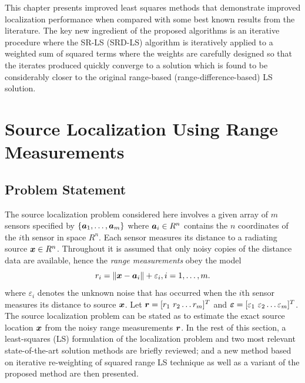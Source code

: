 This chapter presents improved least squares methods that demonstrate improved localization performance when compared with some best known results from the literature. The key new ingredient of the proposed algorithms is an iterative procedure where the SR-LS (SRD-LS) algorithm is iteratively applied to a weighted sum of squared terms where the weights are carefully designed so that the iterates produced quickly converge to a solution which is found to be considerably closer to the original range-based (range-difference-based) LS solution. %



\section{Source Localization Using Range \\ Measurements}%
\subsection{Problem Statement}%


The source localization problem considered here involves a given array of $m$ sensors specified by $\{\mbox{\boldmath$a$}_1,\ldots, \mbox{\boldmath$a$}_m\}$ where $\mbox{\boldmath$a$}_i\in R^n$  contains the $n$ coordinates of the $i$th sensor in space $R^n$. Each sensor measures its distance to a radiating source $\mbox{\boldmath$x$}\in R^n$. Throughout it is assumed that only noisy copies of the distance data are available, hence the \textit{range measurements} obey the model
\begin{equation} \label{eq:3.1}
\setcounter{equation}{1}
r_i = \|{\Bx} - {\Ba}_i\| + \varepsilon_i, i = 1,\ldots , m.
\end{equation}                                                                                                     	where $\varepsilon_i$ denotes the unknown noise that has occurred when the $i$th sensor measures its distance to source $\mbox{\boldmath$x$}$. Let $\mbox{\boldmath$r$}=[r_1 \ r_2 \ldots r_m]^T$ and $\mbox{\boldmath${\varepsilon}$}=[\varepsilon_1 \ \varepsilon_2 \ldots \varepsilon_m]^T$. The source localization problem can be stated as to estimate the exact source location $\mbox{\boldmath$x$}$ from the noisy range measurements $\mbox{\boldmath$r$}$. In the rest of this section, a least-squares (LS) formulation of the localization problem and two most relevant state-of-the-art solution methods are briefly reviewed; and a new method based on iterative re-weighting of squared range LS technique as well as a variant of the proposed method are then presented. %

